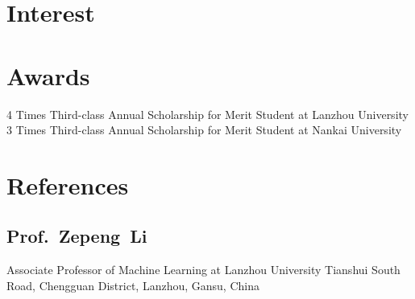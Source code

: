 \documentclass[11pt,a4paper, final]{moderncv}
\newcommand{\spacesection}{\vspace{0.4cm}}
\newcommand{\spacesubsection}{\vspace{0.2cm}}
\begin{document}
\section{\textbf{Interest}}
\section{\textbf{Awards}}
		{4 Times Third-class Annual Scholarship for Merit Student at Lanzhou University}
		{3 Times Third-class Annual Scholarship for Merit Student at Nankai University}
\section{\textbf{References}}
	\subsection{\textbf{Prof.~Zepeng~Li}}
		\cvline{}
		{Associate Professor of Machine Learning at Lanzhou University}
		{Tianshui South Road, Chengguan District, Lanzhou, Gansu, China}
\end{document}
